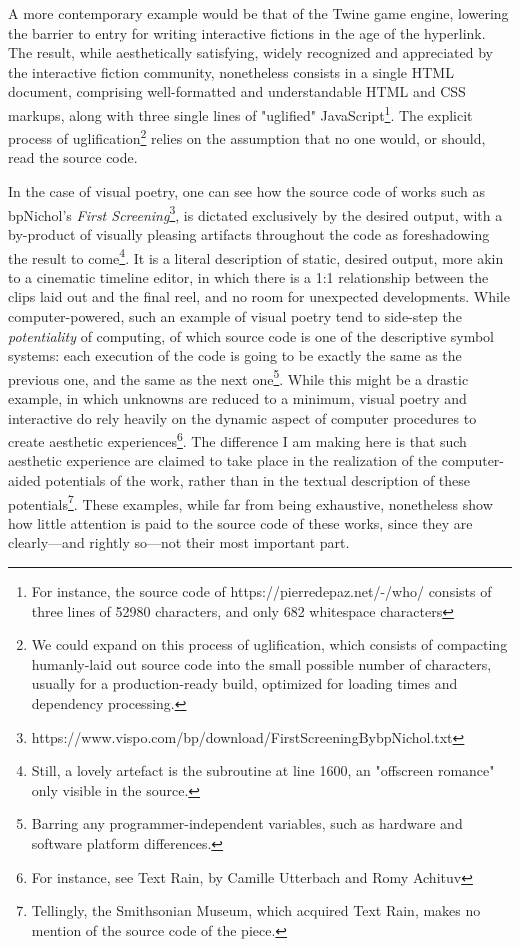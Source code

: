 \documentclass{article}
\begin{document}
A more contemporary example would be that of the Twine game engine, lowering the barrier to entry for writing interactive fictions in the age of the hyperlink. The result, while aesthetically satisfying, widely recognized and appreciated by the interactive fiction community, nonetheless consists in a single HTML document, comprising well-formatted and understandable HTML and CSS markups, along with three single lines of "uglified" JavaScript\footnote{For instance, the source code of https://pierredepaz.net/-/who/ consists of three lines of 52980 characters, and only 682 whitespace characters}. The explicit process of uglification\footnote{We could expand on this process of uglification, which consists of compacting humanly-laid out source code into the small possible number of characters, usually for a production-ready build, optimized for loading times and dependency processing.} relies on the assumption that no one would, or should, read the source code.

In the case of visual poetry, one can see how the source code of works such as bpNichol's \emph{First Screening}\footnote{https://www.vispo.com/bp/download/FirstScreeningBybpNichol.txt}, is dictated exclusively by the desired output, with a by-product of visually pleasing artifacts throughout the code as foreshadowing the result to come\footnote{Still, a lovely artefact is the subroutine at line 1600, an "offscreen romance" only visible in the source.}. It is a literal description of static, desired output, more akin to a cinematic timeline editor, in which there is a 1:1 relationship between the clips laid out and the final reel, and no room for unexpected developments. While computer-powered, such an example of visual poetry tend to side-step the \emph{potentiality} of computing, of which source code is one of the descriptive symbol systems: each execution of the code is going to be exactly the same as the previous one, and the same as the next one\footnote{Barring any programmer-independent variables, such as hardware and software platform differences.}. While this might be a drastic example, in which unknowns are reduced to a minimum, visual poetry and interactive do rely heavily on the dynamic aspect of computer procedures to create aesthetic experiences\footnote{For instance, see Text Rain, by Camille Utterbach and Romy Achituv}. The difference I am making here is that such aesthetic experience are claimed to take place in the realization of the computer-aided potentials of the work, rather than in the textual description of these potentials\footnote{Tellingly, the Smithsonian Museum, which acquired Text Rain, makes no mention of the source code of the piece.}. These examples, while far from being exhaustive, nonetheless show how little attention is paid to the source code of these works, since they are clearly—and rightly so—not their most important part.
\end{document}
